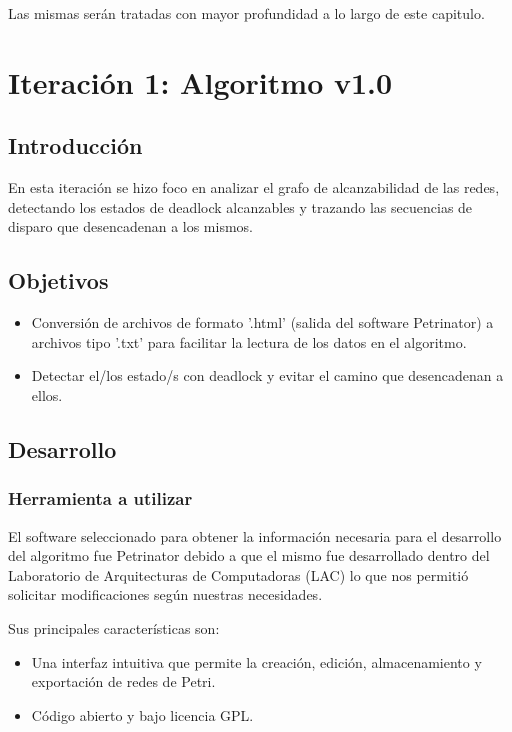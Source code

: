 \par \noindent Las mismas serán tratadas con mayor profundidad a lo largo de este capitulo. 

\section{Iteración 1: Algoritmo v1.0}
\subsection{Introducción}
En esta iteración se hizo foco en analizar el grafo de alcanzabilidad de las redes, detectando los estados de deadlock alcanzables y trazando las secuencias de disparo que desencadenan a los mismos. 
\subsection{Objetivos}
\begin{itemize}
	\item Conversión de archivos de formato '.html' (salida del software Petrinator) a archivos tipo '.txt' para facilitar la lectura de los datos en el algoritmo.
	\item Detectar el/los estado/s con deadlock y evitar el camino que desencadenan a ellos.
\end{itemize}

\subsection{Desarrollo}
\subsubsection{Herramienta a utilizar}
El software seleccionado para obtener la información necesaria para el desarrollo del algoritmo fue Petrinator \cite{petrinator} debido a que el mismo fue desarrollado dentro del Laboratorio de Arquitecturas de Computadoras (LAC) lo que nos permitió solicitar modificaciones según nuestras necesidades. 

\noindent Sus principales características son:
\begin{itemize}
	\item Una interfaz intuitiva que permite la creación, edición, almacenamiento y exportación de redes de Petri.
	\item Código abierto y bajo licencia GPL. 
\end{itemize}

